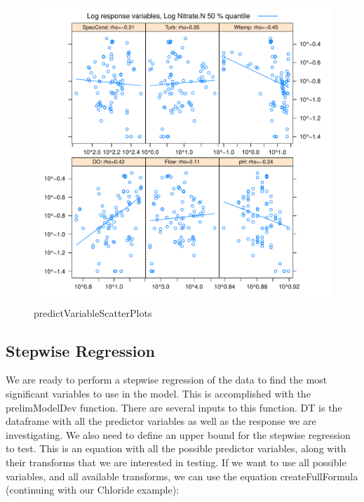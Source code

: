 \documentclass[a4paper,11pt]{article}\usepackage[]{graphicx}\usepackage[]{color}
\makeatletter
\def\maxwidth{ %
  \ifdim\Gin@nat@width>\linewidth
    \linewidth
  \else
    \Gin@nat@width
  \fi
}
\newenvironment{knitrout}{}{} %
\makeatother
\begin{document}
\begin{knitrout}
\begin{figure}[]
\includegraphics[width=\maxwidth]{figure/predictVariableScatterPlots2} \caption[predictVariableScatterPlots]{predictVariableScatterPlots\label{fig:predictVariableScatterPlots2}}
\end{figure}


\end{knitrout}

\FloatBarrier
\subsection{Stepwise Regression}
We are ready to perform a stepwise regression of the data to find the most significant variables to use in the model. This is accomplished with the prelimModelDev function. There are several inputs to this function. DT is the dataframe with all the predictor variables as well as the response we are investigating. We also need to define an upper bound for the stepwise regression to test. This is an equation with all the possible predictor variables, along with their transforms that we are interested in testing. If we want to use all possible variables, and all available transforms, we can use the equation createFullFormula (continuing with our Chloride example):
\end{document}
